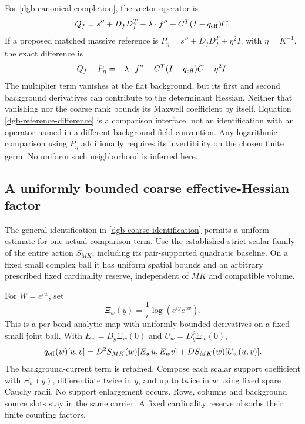 For \eqref{dgb-canonical-completion}, the vector operator is
\begin{equation}
 Q_f=s''+D_fD_f^T-\lambda\cdot f''
                         +C^T(I-q_{\rm eff})C.
 \label{dgb-vector-operator}
\end{equation}
If a proposed matched massive reference is
$P_\eta=s''+D_fD_f^T+\eta^2I$, with $\eta=K^{-1}$,
the exact difference is
\begin{equation}
 Q_f-P_\eta=-\lambda\cdot f''
                     +C^T(I-q_{\rm eff})C-\eta^2I.
 \label{dgb-reference-difference}
\end{equation}
The multiplier term vanishes at the flat background,
but its first and second background derivatives can
contribute to the determinant Hessian. Neither that
vanishing nor the coarse rank bounds its Maxwell
coefficient by itself. Equation
\eqref{dgb-reference-difference} is a comparison interface,
not an identification with an operator named in a
different background-field convention.
Any logarithmic comparison using $P_\eta$ additionally
requires its invertibility on the chosen finite germ.
No uniform such neighborhood is inferred here.

\subsection{A uniformly bounded coarse effective-Hessian factor}
\label{dgb-coarse-bound-section}

The general identification in
\eqref{dgb-coarse-identification} permits a uniform estimate
for one actual comparison term. Use the established strict
scalar family of the entire action $S_{MK}$, including its
pair-supported quadratic baseline. On a fixed small complex
ball it has uniform spatial bounds and an arbitrary
prescribed fixed cardinality reserve, independent of
$MK$ and compatible volume.

For $W=e^{iw}$, set
\[
                    \Xi_w(y)=\frac1i\log(e^{iy}e^{iw}).
\]
This is a per-bond analytic map with uniformly bounded
derivatives on a fixed small joint ball. With
$E_w=D_y\Xi_w(0)$ and $U_w=D_y^2\Xi_w(0)$,
\begin{equation}
 q_{\rm eff}(w)[u,v]
   =D^2S_{MK}(w)[E_wu,E_wv]
                 +DS_{MK}(w)[U_w(u,v)].
 \label{dgb-coarse-BCH}
\end{equation}
The background-current term is retained.
Compose each scalar support coefficient with $\Xi_w(y)$,
differentiate twice in $y$, and up to twice in $w$ using
fixed spare Cauchy radii. No support enlargement occurs.
Rows, columns and background source slots stay in the
same carrier. A fixed cardinality reserve absorbs their
finite counting factors.

